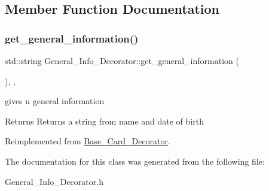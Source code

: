 \subsection{Member Function Documentation}
\mbox{\label{classGeneral__Info__Decorator_a8bc8c352cf14028a9ef2c3e7dce90db7}} 
\subsubsection{\texorpdfstring{get\+\_\+general\+\_\+information()}{get\_general\_information()}}
{\footnotesize\ttfamily std\+::string General\+\_\+\+Info\+\_\+\+Decorator\+::get\+\_\+general\+\_\+information (\begin{DoxyParamCaption}{ }\end{DoxyParamCaption})\hspace{0.3cm}{\ttfamily [inline]}, {\ttfamily [override]}, {\ttfamily [virtual]}}

gives u general information \begin{DoxyReturn}{Returns}
Returns a string from name and date of birth 
\end{DoxyReturn}


Reimplemented from \mbox{\hyperlink{classBase__Card__Decorator}{Base\+\_\+\+Card\+\_\+\+Decorator}}.



The documentation for this class was generated from the following file\+:\begin{DoxyCompactItemize}
\item 
General\+\_\+\+Info\+\_\+\+Decorator.\+h\end{DoxyCompactItemize}
